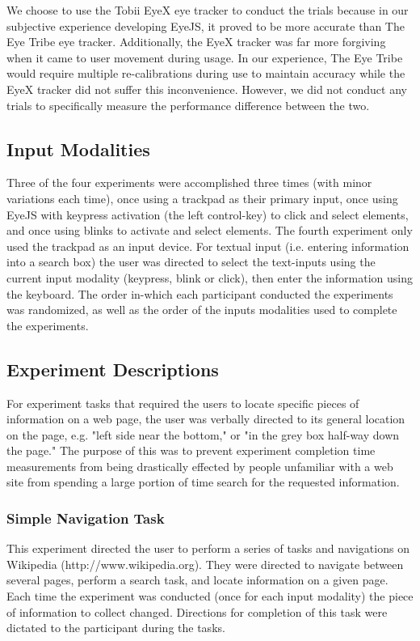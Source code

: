 \documentclass{sigchi}
\begin{document}
We choose to use the Tobii EyeX eye tracker to conduct the trials
because in our subjective experience developing EyeJS, it proved to 
be more accurate than The Eye Tribe eye tracker. Additionally, the 
EyeX tracker was far more forgiving when it came to user movement
during usage. In our experience, The Eye Tribe would require multiple 
re-calibrations during use to maintain accuracy while the EyeX 
tracker did not suffer this inconvenience. However, we did 
not conduct any trials to specifically measure the performance 
difference between the two.

\subsection{Input Modalities}
Three of the four experiments were accomplished three times (with 
minor variations each time), once using a trackpad as their
primary input, once using EyeJS with keypress activation (the 
left control-key) to click and select elements, and once using 
blinks to activate and select elements. The fourth experiment 
only used the trackpad as an input device. For textual input (i.e. 
entering information into a search box) the user was directed to 
select the text-inputs using the current input modality (keypress, 
blink or click), then enter the information using the keyboard. 
The order in-which each participant conducted the experiments was 
randomized, as well as the order of the inputs modalities
used to complete the experiments.

\subsection{Experiment Descriptions}
For experiment tasks that required the users to locate specific pieces
of information on a web page, the user was verbally directed to its
general location on the page, e.g. "left side near the bottom," or
"in the grey box half-way down the page." The purpose of this was to
prevent experiment completion time measurements from being drastically
effected by people unfamiliar with a web site from spending a large 
portion of time search for the requested information.

\subsubsection{Simple Navigation Task}
This experiment directed the user to perform a series of tasks and 
navigations on Wikipedia (http://www.wikipedia.org). They were directed
to navigate between several pages, perform a search task, and locate
information on a given page. Each time the experiment was conducted (once
for each input modality) the piece of information to collect changed.
Directions for completion of this task were dictated to the participant
during the tasks.
\end{document}
